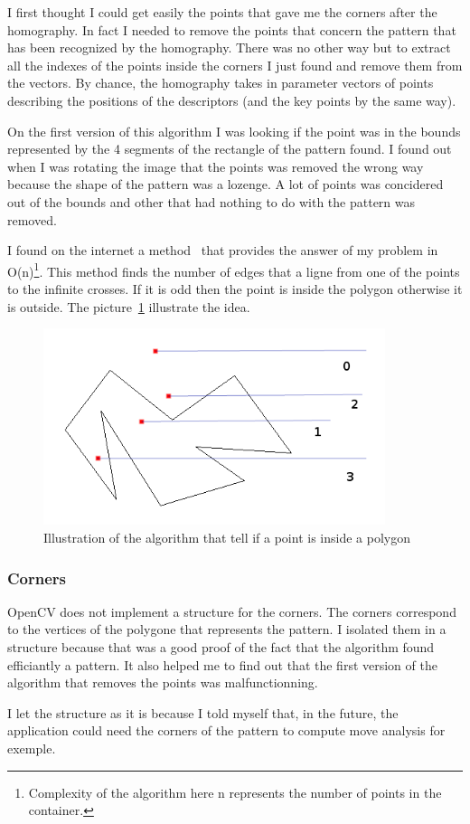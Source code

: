 	\par I first thought I could get easily the points that gave me the corners after the homography. In fact I needed to remove the points that concern the pattern that has been recognized by the homography. There was no other way but to extract all the indexes of the points inside the corners I just found and remove them from the vectors. By chance, the homography takes in parameter vectors of points describing the positions of the descriptors (and the key points by the same way). 
	\par On the first version of this algorithm I was looking if the point was in the bounds represented by the 4 segments of the rectangle of the pattern found. I found out when I was rotating the image that the points was removed the wrong way because the shape of the pattern was a lozenge. A lot of points was concidered out of the bounds and other that had nothing to do with the pattern was removed.
	\par I found on the internet a method~\cite{InOut} that provides the answer of my problem in O(n)\footnote{Complexity of the algorithm here n represents the number of points in the container.}. This method finds the number of edges that a ligne from one of the points to the infinite crosses. If it is odd then the point is inside the polygon otherwise it is outside. The picture~\ref{OutIn} illustrate the idea.
	\begin{figure}[h]
		\begin{center}
			\includegraphics[width=10cm]{images_not_compressed/isIn.png}
			\caption{Illustration of the algorithm that tell if a point is inside a polygon}
			\label{OutIn}	
		\end{center}
	\end{figure}
	\subsubsection{Corners}
	\par OpenCV does not implement a structure for the corners. The corners correspond to the vertices of the polygone that represents the pattern. I isolated them in a structure because that was a good proof of the fact that the algorithm found efficiantly a pattern. It also helped me to find out that the first version of the algorithm that removes the points was malfunctionning.
	\par I let the structure as it is because I told myself that, in the future, the application could need the corners of the pattern to compute move analysis for exemple. 	
	
